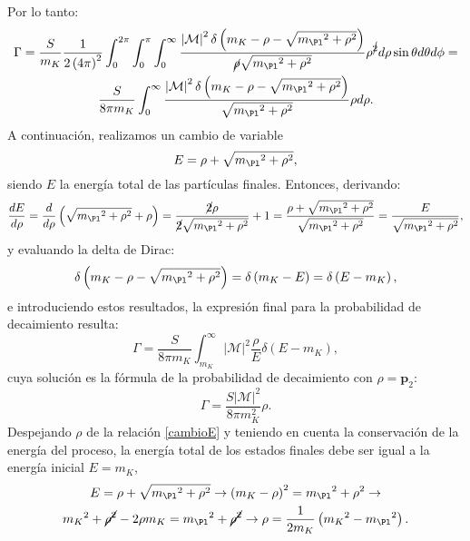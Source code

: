 Por lo tanto:
\begin{multline}
\Gamma =\dfrac{S}{m_{K}}\dfrac{1}{2\left( 4\pi \right) ^{2}}\int ^{2\pi }_{0}\int ^{\pi }_{0}\int ^{\infty }_{0} \dfrac{\left|\mathcal{M}\right| ^{2}\delta\left(m_{K}-\rho-\sqrt{{m_{\Pl}}^{2}+\rho^{2}}\right)}{\cancel{\rho} \sqrt{{m_{\Pl}}^{2}+\rho^{2}}} \rho^{\cancel{2}}d{\rho}\sin \theta d\theta d\phi = \\ \dfrac{S}{8 \pi m_{K}}\int ^{\infty }_{0} \dfrac{\left|\mathcal{M}\right| ^{2}\delta\left(m_{K}-\rho-\sqrt{{m_{\Pl}}^{2}+\rho^{2}}\right)}{\sqrt{{m_{\Pl}}^{2}+\rho^{2}}} \rho d{\rho} .
\end{multline}
A continuación, realizamos un cambio de variable 
\begin{equation}
E=\rho+\sqrt{{m_{\Pl}}^{2}+\rho^{2}} ,\label{cambioE}
\end{equation}
siendo $E$ la energía total de las partículas finales. Entonces, derivando:
\begin{equation}
\dfrac{dE}{d\rho}=\dfrac{d}{d\rho}\left( \sqrt{{m_{\Pl}}^{2}+{\rho}^{2}}+\rho\right) =\dfrac{\cancel{2}\rho}{\cancel{2}\sqrt{{m_{\Pl}}^{2}+\rho^{2}}}+1=\dfrac{\rho + \sqrt{{m_{\Pl}}^{2}+\rho^{2}}}{\sqrt{{m_{\Pl}}^{2}+\rho^{2}}}=\dfrac{E}{\sqrt{{m_{\Pl}}^{2}+\rho^{2}}} ,
\end{equation}
y evaluando la delta de Dirac:
\begin{equation}
\delta \left(m_{K}-\rho-\sqrt{{m_{\Pl}}^{2}+\rho^{2}}\right)=\delta\left(m_{K}-E\right)=\delta\left(E-m_{K}\right),
\end{equation}
e introduciendo estos resultados, la expresión final para la probabilidad de decaimiento resulta:
\begin{equation}
\Gamma=\dfrac{S}{8 \pi m_{K}}\int ^{\infty }_{m_K}\left| \mathcal{M}\right| ^{2}\dfrac{\rho}{E}\delta \left(E-m_{K}\right) ,
\end{equation}
cuya solución es la fórmula de la probabilidad de decaimiento con $\rho=\boldsymbol{p}_2$:
\begin{equation}
\Gamma =\dfrac{S\left| \mathcal{M}\right| ^{2}}{8\pi m_{K}^{2}}\rho .\label{eq:decayratemalo}
\end{equation}
Despejando $\rho$ de la relación \ref{cambioE} y teniendo en cuenta la conservación de la energía del proceso, la energía total de los estados finales debe ser igual a la energía inicial $E=m_K$,
\begin{multline}
E=\rho+\sqrt{{m_{\Pl}}^{2}+\rho^{2}} \rightarrow \left(m_{K}-\rho\right)^{2}= {m_{\Pl}}^{2}+\rho^{2} \rightarrow \\ {m_{K}}^{2}+\cancel{\rho^{2}}-2\rho m_{K}={m_{\Pl}}^{2}+\cancel{\rho^{2}} \rightarrow \rho = \dfrac{1}{2 m_K}\left({m_{K}}^{2}-{m_{\Pl}}^{2}\right) .
\end{multline}

